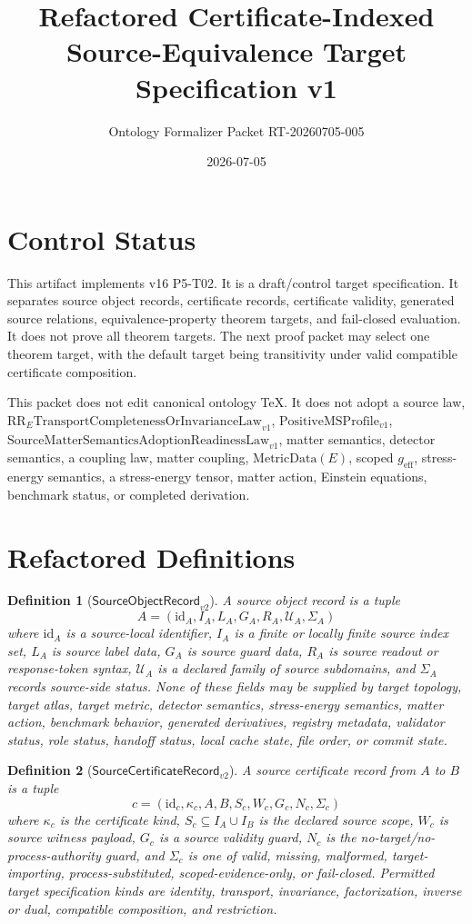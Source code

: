 \documentclass[11pt]{article}
\title{Refactored Certificate-Indexed Source-Equivalence Target Specification v1}
\author{Ontology Formalizer Packet RT-20260705-005}
\date{2026-07-05}
\newcommand{\ObjRec}{\mathsf{SourceObjectRecord}_{v2}}
\newcommand{\CertRec}{\mathsf{SourceCertificateRecord}_{v2}}
\newcommand{\RRELaw}{\mathrm{RR}_{E}\mathrm{TransportCompletenessOrInvarianceLaw}_{v1}}
\newcommand{\PositiveMSProfile}{\mathrm{PositiveMSProfile}_{v1}}
\newcommand{\SMSAR}{\mathrm{SourceMatterSemanticsAdoptionReadinessLaw}_{v1}}
\newcommand{\MetricData}{\mathrm{MetricData}}
\newcommand{\geff}{g_{\mathrm{eff}}}
\newtheorem{definition}{Definition}
\begin{document}
\maketitle

\section{Control Status}

This artifact implements v16 P5-T02. It is a draft/control target
specification. It separates source object records, certificate records,
certificate validity, generated source relations, equivalence-property theorem
targets, and fail-closed evaluation. It does not prove all theorem targets.
The next proof packet may select one theorem target, with the default target
being transitivity under valid compatible certificate composition.

This packet does not edit canonical ontology TeX. It does not adopt a source
law, \(\RRELaw\), \(\PositiveMSProfile\), \(\SMSAR\), matter semantics,
detector semantics, a coupling law, matter coupling, \(\MetricData(E)\),
scoped \(\geff\), stress-energy semantics, a stress-energy tensor, matter
action, Einstein equations, benchmark status, or completed derivation.

\section{Refactored Definitions}

\begin{definition}[\(\ObjRec\)]
A source object record is a tuple
\[
  A=(\mathrm{id}_A, I_A, L_A, G_A, R_A, \mathcal U_A, \Sigma_A)
\]
where \(\mathrm{id}_A\) is a source-local identifier, \(I_A\) is a finite or
locally finite source index set, \(L_A\) is source label data, \(G_A\) is
source guard data, \(R_A\) is source readout or response-token syntax,
\(\mathcal U_A\) is a declared family of source subdomains, and
\(\Sigma_A\) records source-side status. None of these fields may be supplied
by target topology, target atlas, target metric, detector semantics,
stress-energy semantics, matter action, benchmark behavior, generated
derivatives, registry metadata, validator status, role status, handoff
status, local cache state, file order, or commit state.
\end{definition}

\begin{definition}[\(\CertRec\)]
A source certificate record from \(A\) to \(B\) is a tuple
\[
  c=(\mathrm{id}_c,\kappa_c,A,B,S_c,W_c,G_c,N_c,\Sigma_c)
\]
where \(\kappa_c\) is the certificate kind, \(S_c\subseteq I_A\cup I_B\) is
the declared source scope, \(W_c\) is source witness payload, \(G_c\) is a
source validity guard, \(N_c\) is the no-target/no-process-authority guard,
and \(\Sigma_c\) is one of valid, missing, malformed, target-importing,
process-substituted, scoped-evidence-only, or fail-closed. Permitted target
specification kinds are identity, transport, invariance, factorization,
inverse or dual, compatible composition, and restriction.
\end{definition}
\end{document}
